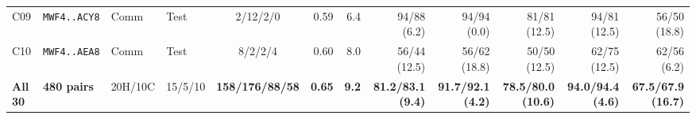 \begin{tabular}{@{}llllcrrrrrrr@{}}
C09 & \texttt{MWF4..ACY8} & Comm & Test & 2/12/2/0 & 0.59 & 6.4 & 94/88 (6.2) & 94/94 (0.0) & 81/81 (12.5) & 94/81 (12.5) & 56/50 (18.8) \\
C10 & \texttt{MWF4..AEA8} & Comm & Test & 8/2/2/4 & 0.60 & 8.0 & 56/44 (12.5) & 56/62 (18.8) & 50/50 (12.5) & 62/75 (12.5) & 62/56 (6.2) \\
\midrule
\textbf{All 30} & \textbf{480 pairs} & 20H/10C & 15/5/10 & \textbf{158/176/88/58} & \textbf{0.65} & \textbf{9.2} & \textbf{81.2/83.1 (9.4)} & \textbf{91.7/92.1 (4.2)} & \textbf{78.5/80.0 (10.6)} & \textbf{94.0/94.4 (4.6)} & \textbf{67.5/67.9 (16.7)} \\
\bottomrule
\end{tabular}
